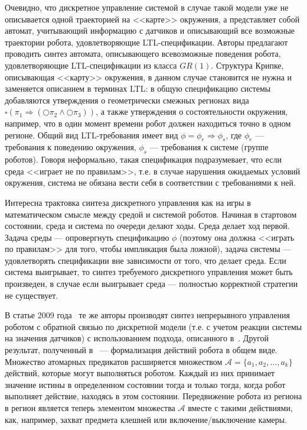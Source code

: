 \documentclass[a4, 14pt]{article}
\begin{document}
Очевидно, что дискретное управление системой в случае такой модели уже не 
описывается одной траекторией на <<карте>> окружения, а представляет собой автомат, 
учитывающий информацию с датчиков и описывающий все возможные траектории робота, удовлетворяющие LTL-спецификации. 
Авторы предлагают проводить синтез автомата, описывающего всевозможные поведения робота, 
удовлетворяющие LTL-спецификации из класса $GR(1)$. Структура Крипке, описывающая <<карту>> 
окружения, в данном случае становится не нужна и заменяется описанием в терминах 
LTL: в общую спецификацию системы добавляются утверждения о геометрически смежных 
регионах вида $\square(\pi_1\Rightarrow(\bigcirc\pi_2\wedge\bigcirc\pi_3))$, а также 
утверждения о состоятельности окружения, например, что в один момент времени робот должен 
находиться точно в одном регионе. Общий вид LTL-требования имеет вид $\phi=\phi_e\Rightarrow\phi_s$, 
где $\phi_e$ --- требования к поведению окружения, $\phi_s$ --- требования к 
системе (группе роботов). Говоря неформально, такая спецификация подразумевает, 
что если среда <<играет не по правилам>>, т.е. в случае нарушения ожидаемых 
условий окружения, система не обязана вести себя в соответствии с требованиями к ней.

Интересна трактовка синтеза дискретного управления как на игры в математическом смысле 
между средой и системой роботов. Начиная в стартовом состоянии, среда и система 
по очереди делают ходы. Среда делает ход первой. Задача среды --- опровергнуть 
спецификацию $\phi$ (поэтому она должна <<играть по правилам>> для того, чтобы 
импликация была ложной), задача системы --- удовлетворять спецификации вне 
зависимости от того, что делает среда. Если система выигрывает, то синтез 
требуемого дискретного управления может быть произведен, в случае если 
выигрывает среда --- полностью корректной стратегии не существует.

В статье 2009 года~\cite{kress2009temporal} те же авторы производят синтез непрерывного управления 
роботом с обратной связью по дискретной модели (т.е. с учетом реакции системы 
на значения датчиков) с использованием подхода, описанного в~\cite{conner2003composition}. 
Другой результат, полученный в~\cite{kress2009temporal} --- формализация действий 
робота в общем виде. Множество атомарных предикатов расширяется множеством 
$\mathcal{A}=\{a_1,a_2,\dots,a_k\}$ действий, которые могут выполняться роботом. Каждый 
из них принимает значение истины в определенном состоянии тогда и только тогда, 
когда робот выполняет действие, находясь в этом состоянии. Передвижение робота 
из региона в регион является теперь элементом множества $\mathcal{A}$ вместе с такими 
действиями, как, например, захват предмета клешней или включение/выключение камеры.
\end{document}
